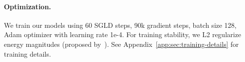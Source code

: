 \documentclass{article}
\begin{document}

\paragraph{Optimization.} We train our models using 60 SGLD steps, 90k gradient steps, batch size 128, Adam optimizer with learning rate 1e-4. For training stability, we L2 regularize energy magnitudes (proposed by~\citet{du2019implicit}). See Appendix~\ref{app:sec:training-details} for training details.


\end{document}
